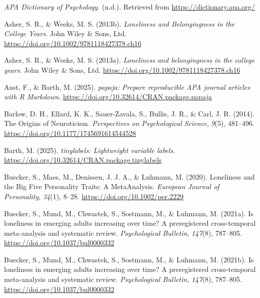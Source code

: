 \documentclass[
  english,
  man]{apa6}
\newlength{\cslhangindent}
\newenvironment{CSLReferences}[2] %
 {\begin{list}{}{%
  \setlength{\itemindent}{0pt}
  \setlength{\leftmargin}{0pt}
  \setlength{\parsep}{0pt}
  \ifodd #1
   \setlength{\leftmargin}{\cslhangindent}
   \setlength{\itemindent}{-1\cslhangindent}
  \fi
  \setlength{\itemsep}{#2\baselineskip}}}
 {\end{list}}
\begin{document}
\label{refs}
\begin{CSLReferences}{1}{0}
\emph{APA Dictionary of Psychology}. (n.d.). Retrieved from \url{https://dictionary.apa.org/}

Asher, S. R., \& Weeks, M. S. (2013b). \emph{Loneliness and Belongingness in the College Years}. John Wiley \& Sons, Ltd. \url{https://doi.org/10.1002/9781118427378.ch16}

Asher, S. R., \& Weeks, M. S. (2013a). \emph{Loneliness and belongingness in the college years}. John Wiley \& Sons, Ltd. \url{https://doi.org/10.1002/9781118427378.ch16}

Aust, F., \& Barth, M. (2025). \emph{{papaja}: {Prepare} reproducible {APA} journal articles with {R Markdown}}. \url{https://doi.org/10.32614/CRAN.package.papaja}

Barlow, D. H., Ellard, K. K., Sauer-Zavala, S., Bullis, J. R., \& Carl, J. R. (2014). The Origins of Neuroticism. \emph{Perspectives on Psychological Science}, \emph{9}(5), 481--496. \url{https://doi.org/10.1177/1745691614544528}

Barth, M. (2025). \emph{{tinylabels}: Lightweight variable labels}. \url{https://doi.org/10.32614/CRAN.package.tinylabels}

Buecker, S., Maes, M., Denissen, J. J. A., \& Luhmann, M. (2020). Loneliness and the Big Five Personality Traits: A Meta{\textendash}Analysis. \emph{European Journal of Personality}, \emph{34}(1), 8--28. \url{https://doi.org/10.1002/per.2229}

Buecker, S., Mund, M., Chwastek, S., Sostmann, M., \& Luhmann, M. (2021a). Is loneliness in emerging adults increasing over time? A preregistered cross-temporal meta-analysis and systematic review. \emph{Psychological Bulletin}, \emph{147}(8), 787--805. \url{https://doi.org/10.1037/bul0000332}

Buecker, S., Mund, M., Chwastek, S., Sostmann, M., \& Luhmann, M. (2021b). Is loneliness in emerging adults increasing over time? A preregistered cross-temporal meta-analysis and systematic review. \emph{Psychological Bulletin}, \emph{147}(8), 787--805. \url{https://doi.org/10.1037/bul0000332}


\end{CSLReferences}
\end{document}
